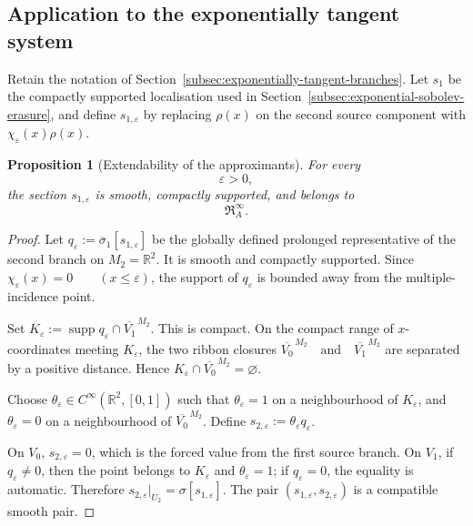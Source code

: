 \documentclass[11pt]{article}
\theoremstyle{plain}
\newtheorem{proposition}[theorem]{Proposition}
\theoremstyle{definition}
\begin{document}
\subsection{Application to the exponentially tangent system}
\label{appsubsec:exponential-application}

Retain the notation of
Section~\ref{subsec:exponentially-tangent-branches}.
Let \(s_1\) be the compactly supported localisation used in
Section~\ref{subsec:exponential-sobolev-erasure}, and define
\(s_{1,\varepsilon}\) by replacing \(\rho(x)\) on the second source
component with
\(\chi_\varepsilon(x)\rho(x)\).

\begin{proposition}[Extendability of the approximants]
\label{prop:extendability-exponential-approximants}
For every
\[
  \varepsilon>0,
\]
the section \(s_{1,\varepsilon}\) is smooth, compactly supported, and
belongs to
\[
  \mathfrak R_A^\infty.
\]
\end{proposition}

\begin{proof}
Let \(q_\varepsilon := \overline{\sigma}_1[s_{1,\varepsilon}]\) be the globally defined prolonged representative of the second branch
on \(M_2=\mathbb R^2\). It is smooth and compactly supported. Since
\(\chi_\varepsilon(x)=0 \qquad (x\leq\varepsilon)\),
the support of \(q_\varepsilon\) is bounded away from the
multiple-incidence point.

Set
\(K_\varepsilon := \operatorname{supp}q_\varepsilon \cap \overline{V_1}^{\,M_2}\).
This is compact. On the compact range of \(x\)-coordinates meeting
\(K_\varepsilon\), the two ribbon closures \(\overline{V_0}^{\,M_2} \quad\text{and}\quad \overline{V_1}^{\,M_2}\) are separated by a positive distance. Hence
\(K_\varepsilon \cap \overline{V_0}^{\,M_2} = \varnothing\).

Choose \(\theta_\varepsilon \in C^\infty(\mathbb R^2,[0,1])\) such that \(\theta_\varepsilon=1\) on a neighbourhood of \(K_\varepsilon\), and \(\theta_\varepsilon=0\) on a neighbourhood of
\(\overline{V_0}^{\,M_2}\). Define
\(s_{2,\varepsilon} := \theta_\varepsilon q_\varepsilon\).

On \(V_0\),
\(s_{2,\varepsilon}=0\),
which is the forced value from the first source branch. On \(V_1\), if
\(q_\varepsilon\neq0\), then the point belongs to
\(K_\varepsilon\) and \(\theta_\varepsilon=1\); if
\(q_\varepsilon=0\), the equality is automatic. Therefore
\(s_{2,\varepsilon}|_{U_2} = \sigma[s_{1,\varepsilon}]\).
The pair \((s_{1,\varepsilon},s_{2,\varepsilon})\) is a compatible smooth pair.
\end{proof}
\end{document}
